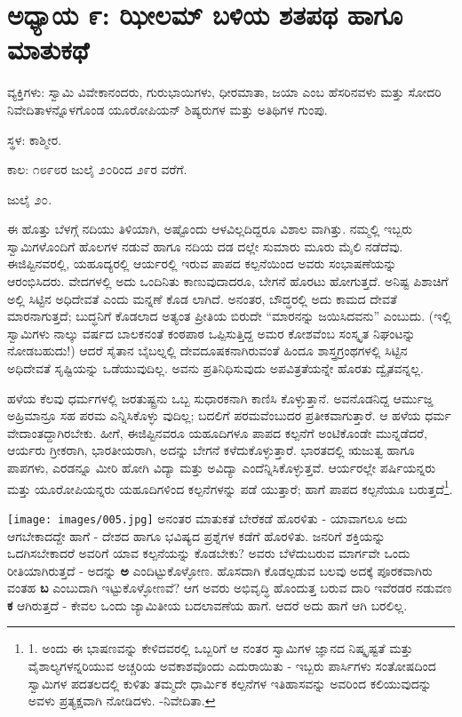 
\chapter{ಅಧ್ಯಾಯ ೯: ಝೀಲಮ್​ ಬಳಿಯ ಶತಪಥ ಹಾಗೂ ಮಾತುಕಥೆ}

ವ್ಯಕ್ತಿಗಳು: ಸ್ವಾಮಿ ವಿವೇಕಾನಂದರು, ಗುರುಭಾಯಿಗಳು, ಧೀರಮಾತಾ, ಜಯಾ ಎಂಬ ಹೆಸರಿನವಳು ಮತ್ತು ಸೋದರಿ ನಿವೇದಿತಾಳನ್ನೊಳಗೊಂಡ ಯೂರೋಪಿಯನ್ ಶಿಷ್ಯರುಗಳ ಮತ್ತು ಅತಿಥಿಗಳ ಗುಂಪು.

ಸ್ಥಳ: ಕಾಶ್ಮೀರ.

ಕಾಲ: ೧೮೯೮ರ ಜುಲೈ ೨೦ರಿಂದ ೨೯ರ ವರೆಗೆ.

ಜುಲೈ ೨೦.

ಈ ಹೊತ್ತು ಬೆಳಗ್ಗೆ ನದಿಯು ತಿಳಿಯಾಗಿ, ಅಷ್ಟೊಂದು ಆಳವಿಲ್ಲದಿದ್ದರೂ ವಿಶಾಲ ವಾಗಿತ್ತು. ನಮ್ಮಲ್ಲಿ ಇಬ್ಬರು ಸ್ವಾಮಿಗಳೊಂದಿಗೆ ಹೊಲಗಳ ನಡುವೆ ಹಾಗೂ ನದಿಯ ದಡ ದಲ್ಲೇ ಸುಮಾರು ಮೂರು ಮೈಲಿ ನಡೆದೆವು. ಈಜಿಪ್ಟಿನವರಲ್ಲಿ, ಯಹೂದ್ಯರಲ್ಲಿ  ಆರ್ಯರಲ್ಲಿ ಇರುವ ಪಾಪದ ಕಲ್ಪನೆಯಿಂದ ಅವರು ಸಂಭಾಷಣೆಯನ್ನು ಆರಂಭಿಸಿದರು. ವೇದಗಳಲ್ಲಿ ಅದು ಒಂದಿನಿತು ಕಾಣುವುದಾದರೂ, ಬೇಗನೆ ಹೊರಟು ಹೋಗುತ್ತದೆ. ಅನಿಷ್ಟ ಪಿಶಾಚಿಗೆ ಅಲ್ಲಿ ಸಿಟ್ಟಿನ ಅಧಿದೇವತೆ ಎಂದು ಮನ್ನಣೆ ಕೊಡ ಲಾಗಿದೆ. ಅನಂತರ, ಬೌದ್ಧರಲ್ಲಿ ಅದು ಕಾಮದ ದೇವತೆ ಮಾರನಾಗುತ್ತದೆ; ಬುದ್ಧನಿಗೆ ಕೊಡಲಾದ ಅತ್ಯಂತ ಪ್ರೀತಿಯ ಬಿರುದೇ “ಮಾರನನ್ನು ಜಯಿಸಿದವನು” ಎಂಬುದು. (ಇಲ್ಲಿ ಸ್ವಾಮಿಗಳು ನಾಲ್ಕು ವರ್ಷದ ಬಾಲಕನಂತೆ ಕಂಠಪಾಠ ಒಪ್ಪಿಸುತ್ತಿದ್ದ ಅಮರ ಕೋಶವೆಂಬ ಸಂಸ್ಕೃತ ನಿಘಂಟನ್ನು ನೋಡಬಹುದು!) ಆದರೆ ಸೈತಾನ ಬೈಬಲ್ನಲ್ಲಿ ದೇವದೂಷಕನಾಗಿರುವಂತೆ ಹಿಂದೂ ಶಾಸ್ತ್ರಗ್ರಂಥಗಳಲ್ಲಿ ಸಿಟ್ಟಿನ ಅಧಿದೇವತೆ ಸೃಷ್ಟಿಯನ್ನು ಒಡೆಯುವುದಿಲ್ಲ. ಅವನು ಪ್ರತಿನಿಧಿಸುವುದು ಅಪವಿತ್ರತೆಯನ್ನೇ ಹೊರತು ದ್ವೈತವನ್ನಲ್ಲ.

ಹಳೆಯ ಕೆಲವು ಧರ್ಮಗಳಲ್ಲಿ ಜರತುಷ್ಟ್ರನು ಒಬ್ಬ ಸುಧಾರಕನಾಗಿ ಕಾಣಿಸಿ ಕೊಳ್ಳುತ್ತಾನೆ. ಅವನೊಡನಿದ್ದ ಆರ್ಮುಜ್ಡ ಅಹ್ರಿಮಾನ್ರೂ ಸಹ ಪರಮ ಎನ್ನಿಸಿಕೊಳ್ಳು ವುದಿಲ್ಲ; ಬದಲಿಗೆ ಪರಮವೆಂಬುದರ ಪ್ರತೀಕವಾಗುತ್ತಾರೆ. ಆ ಹಳೆಯ ಧರ್ಮ ವೇದಾಂತದ್ದಾಗಿರಬೇಕು. ಹೀಗೆ, ಈಜಿಪ್ಟಿನವರೂ ಯಹೂದಿಗಳೂ  ಪಾಪದ ಕಲ್ಪನೆಗೆ ಅಂಟಿಕೊಂಡೇ ಮುನ್ನಡೆದರೆ, ಆರ್ಯರು ಗ್ರೀಕರಾಗಿ, ಭಾರತೀಯರಾಗಿ, ಅದನ್ನು ಬೇಗನೆ ಕಳೆದುಕೊಳ್ಳುತ್ತಾರೆ. ಭಾರತದಲ್ಲಿ ಋಜುತ್ವ ಹಾಗೂ ಪಾಪಗಳು, ಎರಡನ್ನೂ ಮೀರಿ ಹೋಗಿ ವಿದ್ಯಾ ಮತ್ತು ಅವಿದ್ಯಾ ಎಂದೆನ್ನಿಸಿಕೊಳ್ಳುತ್ತವೆ. ಆರ್ಯರಲ್ಲೇ ಪರ್ಷಿಯನ್ನರು ಮತ್ತು ಯೂರೋಪಿಯನ್ನರು ಯಹೂದಿಗಳಿಂದ ಕಲ್ಪನೆಗಳನ್ನು ಪಡೆ ಯುತ್ತಾರೆ; ಹಾಗೆ ಪಾಪದ ಕಲ್ಪನೆಯೂ ಬರುತ್ತದೆ\footnote{1. ಅಂದು ಈ ಭಾಷಣವನ್ನು ಕೇಳಿದವರಲ್ಲಿ ಒಬ್ಬರಿಗೆ ಆ ನಂತರ ಸ್ವಾಮಿಗಳ ಜ್ಞಾನದ ನಿಷ್ಕೃಷ್ಟತೆ ಮತ್ತು ವೈಶಾಲ್ಯಗಳನ್ನರಿಯುವ ಅಚ್ಚರಿಯ ಅವಕಾಶವೊಂದು ಎದುರಾಯಿತು - ಇಬ್ಬರು ಪಾರ್ಸಿಗಳು ಸಂತೋಷದಿಂದ ಸ್ವಾಮಿಗಳ ಪದತಲದಲ್ಲಿ ಕುಳಿತು ತಮ್ಮದೇ ಧಾರ್ಮಿಕ ಕಲ್ಪನೆಗಳ ಇತಿಹಾಸವನ್ನು ಅವರಿಂದ ಕಲಿಯುವುದನ್ನು ಅವಳು ಪ್ರತ್ಯಕ್ಷವಾಗಿ ನೋಡಿದಳು. -ನಿವೇದಿತಾ.}.

\texttt{[image: images/005.jpg]}
ಅನಂತರ ಮಾತುಕತೆ ಬೇರೆಕಡೆ ಹೊರಳಿತು - ಯಾವಾಗಲೂ ಅದು ಆಗಬೇಕಾದದ್ದೇ ಹಾಗೆ - ದೇಶದ ಹಾಗೂ ಭವಿಷ್ಯದ ಪ್ರಶ್ನೆಗಳ ಕಡೆಗೆ ಹೊರಳಿತು. ಜನರಿಗೆ ಶಕ್ತಿಯನ್ನು ಒದಗಿಸಬೇಕಾದರೆ ಅವರಿಗೆ ಯಾವ ಕಲ್ಪನೆಯನ್ನು ಕೊಡಬೇಕು? ಅವರು ಬೆಳೆದುಬರುವ ಮಾರ್ಗವೇ ಒಂದು ರೀತಿಯಾಗಿರುತ್ತದೆ - ಅದನ್ನು \textbf{ಅ} ಎಂದಿಟ್ಟುಕೊಳ್ಳೋಣ. ಹೊಸದಾಗಿ ಕೊಡಲ್ಪಡುವ ಬಲವು ಅದಕ್ಕೆ ಪೂರಕವಾಗಿರು ವಂತಹ
 \textbf{ಬ} ಎಂಬುದಾಗಿ ಇಟ್ಟುಕೊಳ್ಳೋಣವೆ? ಆಗ ಅವರು ಅಭಿವೃದ್ಧಿ ಹೊಂದುತ್ತ ಬರುವ ದಾರಿ ಇವೆರಡರ ನಡುವಣ \textbf{ಕ} ಆಗಿರುತ್ತದೆ - ಕೇವಲ ಒಂದು ಜ್ಯಾಮಿತೀಯ ಬದಲಾವಣೆಯ ಹಾಗೆ. ಆದರೆ ಅದು ಹಾಗೆ ಆಗಿ ಬರಲಿಲ್ಲ.

